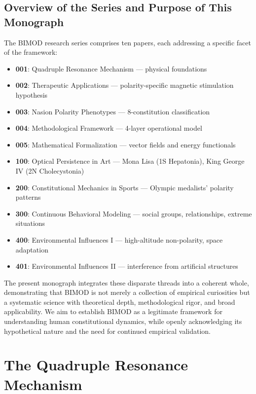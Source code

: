 \documentclass[12pt,a4paper]{article}
\begin{document}
\subsection{Overview of the Series and Purpose of This Monograph}

The BIMOD research series comprises ten papers, each addressing a specific facet of the framework:

\begin{itemize}
    \item \textbf{001}: Quadruple Resonance Mechanism — physical foundations \cite{yoon2026_001}
    \item \textbf{002}: Therapeutic Applications — polarity-specific magnetic stimulation hypothesis \cite{yoon2026_002}
    \item \textbf{003}: Nasion Polarity Phenotypes — 8-constitution classification \cite{yoon2026_003}
    \item \textbf{004}: Methodological Framework — 4-layer operational model \cite{yoon2026_004}
    \item \textbf{005}: Mathematical Formalization — vector fields and energy functionals \cite{yoon2026_005}
    \item \textbf{100}: Optical Persistence in Art — Mona Lisa (1S Hepatonia), King George IV (2N Cholecystonia) \cite{yoon2026_100}
    \item \textbf{200}: Constitutional Mechanics in Sports — Olympic medalists' polarity patterns \cite{yoon2026_200}
    \item \textbf{300}: Continuous Behavioral Modeling — social groups, relationships, extreme situations \cite{yoon2026_300}
    \item \textbf{400}: Environmental Influences I — high-altitude non-polarity, space adaptation \cite{yoon2026_400}
    \item \textbf{401}: Environmental Influences II — interference from artificial structures \cite{yoon2026_401}
\end{itemize}

The present monograph integrates these disparate threads into a coherent whole, demonstrating that BIMOD is not merely a collection of empirical curiosities but a systematic science with theoretical depth, methodological rigor, and broad applicability. We aim to establish BIMOD as a legitimate framework for understanding human constitutional dynamics, while openly acknowledging its hypothetical nature and the need for continued empirical validation.

\section{The Quadruple Resonance Mechanism}
\end{document}
